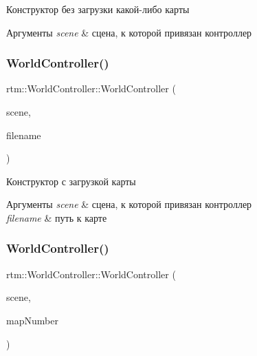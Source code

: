 Конструктор без загрузки какой-\/либо карты 


\begin{DoxyParams}{Аргументы}
{\em scene} & сцена, к которой привязан контроллер \\
\hline
\end{DoxyParams}
\mbox{\label{classrtm_1_1_world_controller_abe5fb63dc74f98dd25e1896d567d5caf}} 
\subsubsection{\texorpdfstring{World\+Controller()}{WorldController()}\hspace{0.1cm}{\footnotesize\ttfamily [2/3]}}
{\footnotesize\ttfamily rtm\+::\+World\+Controller\+::\+World\+Controller (\begin{DoxyParamCaption}\item[{\hyperlink{classrtm_1_1_world_scene}{World\+Scene} $\ast$const}]{scene,  }\item[{std\+::string const \&}]{filename }\end{DoxyParamCaption})}



Конструктор с загрузкой карты 


\begin{DoxyParams}{Аргументы}
{\em scene} & сцена, к которой привязан контроллер \\
\hline
{\em filename} & путь к карте \\
\hline
\end{DoxyParams}
\mbox{\label{classrtm_1_1_world_controller_ac2f5bcddd4192807bb5ea30440d3defc}} 
\subsubsection{\texorpdfstring{World\+Controller()}{WorldController()}\hspace{0.1cm}{\footnotesize\ttfamily [3/3]}}
{\footnotesize\ttfamily rtm\+::\+World\+Controller\+::\+World\+Controller (\begin{DoxyParamCaption}\item[{\hyperlink{classrtm_1_1_world_scene}{World\+Scene} $\ast$const}]{scene,  }\item[{size\+\_\+t}]{map\+Number }\end{DoxyParamCaption})}



